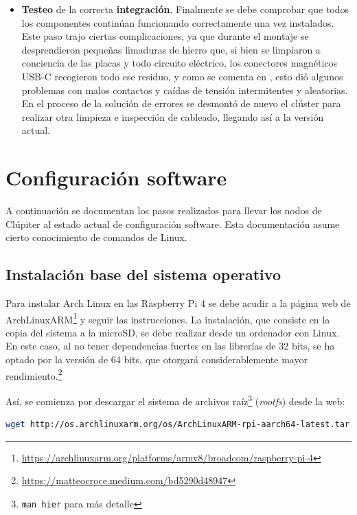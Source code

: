 \begin{itemize}
    \item \textbf{Testeo} de la correcta \textbf{integración}. Finalmente se debe comprobar que todos los componentes continúan funcionando correctamente una vez instalados. Este paso trajo ciertas complicaciones, ya que durante el montaje se desprendieron pequeñas limaduras de hierro que, si bien se limpiaron a conciencia de las placas y todo circuito eléctrico, los conectores magnéticos USB-C recogieron todo ese residuo, y como se comenta en , esto dió algunos problemas con malos contactos y caídas de tensión intermitentes y aleatorias. En el proceso de la solución de errores se desmontó de nuevo el clúster para realizar otra limpieza e inspección de cableado, llegando así a la versión actual.
\end{itemize}

\section{Configuración software}
\label{sec:configuracion_software}
A continuación se documentan los pasos realizados para llevar los nodos de Clúpiter al estado actual de configuración software. Esta documentación asume cierto conocimiento de comandos de Linux.

\subsection{Instalación base del sistema operativo}
\label{ssec:instalacion_sistema_operativo}
Para instalar Arch Linux en las Raspberry Pi 4 se debe acudir a la página web de ArchLinuxARM\footnote{\url{https://archlinuxarm.org/platforms/armv8/broadcom/raspberry-pi-4}} y seguir las instrucciones. La instalación, que consiste en la copia del sistema a la microSD, se debe realizar desde un ordenador con Linux. En este caso, al no tener dependencias fuertes en las librerías de 32 bits, se ha optado por la versión de 64 bits, que otorgará considerablemente mayor rendimiento.\footnote{\url{https://matteocroce.medium.com/bd5290d48947}}

Así, se comienza por descargar el sistema de archivos raíz\footnote{\texttt{man hier} para más detalle} (\textit{\gls{rootfs}}) desde la web:

\begin{lstlisting}[language=bash]
wget http://os.archlinuxarm.org/os/ArchLinuxARM-rpi-aarch64-latest.tar.gz
\end{lstlisting}


